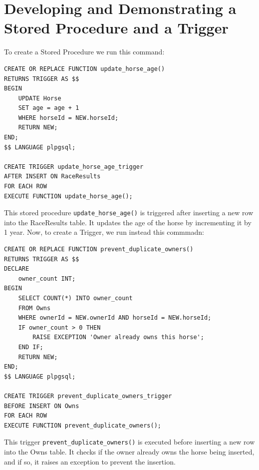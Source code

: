 \documentclass{article}
\def\c#1{\texttt{#1}}
\begin{document}
\section{Developing and Demonstrating a Stored Procedure and a Trigger} %
\label{sec:Developing and Demonstrating a Stored Procedure and a Trigger}
To create a Stored Procedure we run this command:
\begin{lstlisting}
CREATE OR REPLACE FUNCTION update_horse_age()
RETURNS TRIGGER AS $$
BEGIN
    UPDATE Horse
    SET age = age + 1
    WHERE horseId = NEW.horseId;
    RETURN NEW;
END;
$$ LANGUAGE plpgsql;

CREATE TRIGGER update_horse_age_trigger
AFTER INSERT ON RaceResults
FOR EACH ROW
EXECUTE FUNCTION update_horse_age();
\end{lstlisting}
This stored procedure \c{update\_horse\_age()} is triggered after inserting a new row into the RaceResults table. It updates the age of the horse by incrementing it by 1 year. Now, to create a Trigger, we run instead this commmadn:
\begin{lstlisting}
CREATE OR REPLACE FUNCTION prevent_duplicate_owners()
RETURNS TRIGGER AS $$
DECLARE
    owner_count INT;
BEGIN
    SELECT COUNT(*) INTO owner_count
    FROM Owns
    WHERE ownerId = NEW.ownerId AND horseId = NEW.horseId;
    IF owner_count > 0 THEN
        RAISE EXCEPTION 'Owner already owns this horse';
    END IF;
    RETURN NEW;
END;
$$ LANGUAGE plpgsql;

CREATE TRIGGER prevent_duplicate_owners_trigger
BEFORE INSERT ON Owns
FOR EACH ROW
EXECUTE FUNCTION prevent_duplicate_owners();
\end{lstlisting}
This trigger \c{prevent\_duplicate\_owners()} is executed before inserting a new row into the Owns table. It checks if the owner already owns the horse being inserted, and if so, it raises an exception to prevent the insertion.
\end{document}

